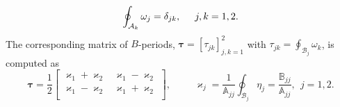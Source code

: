 \documentclass[10pt,oneside,reqno]{amsart}
\numberwithin{equation}{section}
\begin{document}
\begin{equation*}
  \oint_{\mathcal A_k}\omega_j = \delta_{jk},\hspace{0.5cm}j,k=1,2.
\end{equation*}
The corresponding matrix of $B$-periods, ${\boldsymbol \tau}=[\tau_{jk}]_{j,k=1}^2$ with $\tau_{jk} = \oint_{\mathcal B_j}\omega_k$, is computed as
\begin{equation}\label{Bmat}
  {\boldsymbol \tau}=\frac{1}{2}\begin{bmatrix}
        \varkappa_1+\varkappa_2 & \varkappa_1-\varkappa_2\\
\varkappa_1-\varkappa_2 & \varkappa_1+\varkappa_2\\
       \end{bmatrix},\hspace{1cm} \varkappa_j = \frac{1}{\mathbb{A}_{jj}}\oint_{\mathcal{B}_j}\eta_j=\frac{\mathbb{B}_{jj}}{\mathbb{A}_{jj}},\ \ j=1,2.
\end{equation}
\end{document}
